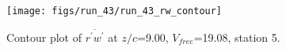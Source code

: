 \begin{figure}[H]
\centering
\texttt{[image: figs/run\_43/run\_43\_rw\_contour]}
\caption{Contour plot of $\overline{r^\prime w^\prime}$ at $z/c$=9.00, $V_{free}$=19.08, station 5.}
\label{fig:run_43_rw_contour}
\end{figure}


